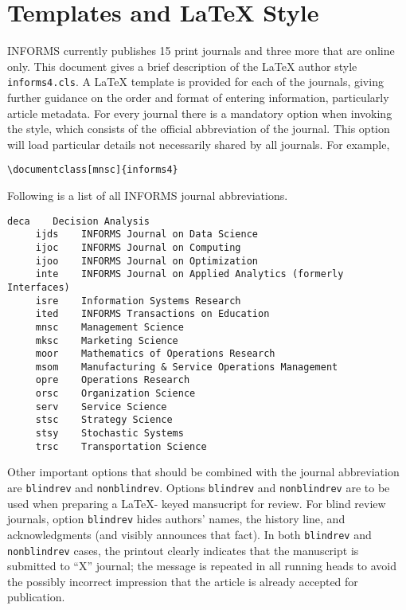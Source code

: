 \documentclass[ijds,nonblindrev]{informs4}
\begin{document}

\maketitle

\section{Templates and LaTeX Style}\label{sec1}

INFORMS currently publishes 15 print journals and three more that are online 
only. This document gives a brief description of 
the LaTeX author style \texttt{informs4.cls}. A LaTeX template is 
provided for each of the journals, giving further guidance on the order and 
format of entering information, particularly article metadata. For every 
journal there is a mandatory option when invoking the style, which consists 
of the official abbreviation of the journal. This option will load 
particular details not necessarily shared by all journals. For example,

\begin{Verbatim}[fontsize=\small]
     \documentclass[mnsc]{informs4}
\end{Verbatim}

Following is a list of all INFORMS journal abbreviations.

\begin{Verbatim}[fontsize=\small]
     deca    Decision Analysis
     ijds    INFORMS Journal on Data Science
     ijoc    INFORMS Journal on Computing
     ijoo    INFORMS Journal on Optimization
     inte    INFORMS Journal on Applied Analytics (formerly Interfaces)
     isre    Information Systems Research 
     ited    INFORMS Transactions on Education 
     mnsc    Management Science 
     mksc    Marketing Science
     moor    Mathematics of Operations Research
     msom    Manufacturing & Service Operations Management
     opre    Operations Research
     orsc    Organization Science
     serv    Service Science
     stsc    Strategy Science
     stsy    Stochastic Systems
     trsc    Transportation Science
\end{Verbatim}

Other important options that should be combined with the journal 
abbreviation are \texttt{blindrev} and \texttt{nonblindrev}. Options 
\texttt{blindrev} and \texttt{nonblindrev} are to be used when 
preparing a LaTeX- keyed mansucript for review. For blind review journals, 
option \texttt{blindrev} hides authors' names, the history line, and 
acknowledgments (and visibly announces that fact). In both
\texttt{blindrev} and \texttt{nonblindrev} cases, the printout clearly indicates  
that the manuscript is submitted to ``X'' journal; the message is repeated 
in all running heads to avoid the possibly incorrect impression that the 
article is already accepted for publication.
\end{document}
